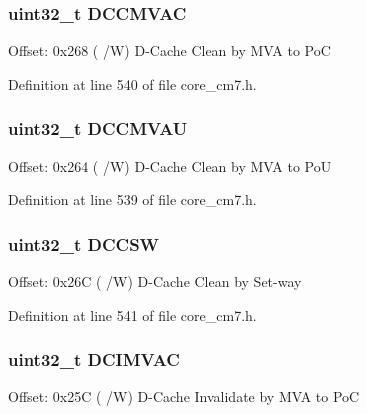 \subsubsection[{\texorpdfstring{D\+C\+C\+M\+V\+AC}{DCCMVAC}}]{ uint32\+\_\+t D\+C\+C\+M\+V\+AC}\hypertarget{struct_s_c_b___type_acc23dc74d8f0378d81bc72302e325e50}{}\label{struct_s_c_b___type_acc23dc74d8f0378d81bc72302e325e50}
Offset\+: 0x268 ( /W) D-\/\+Cache Clean by M\+VA to PoC 

Definition at line 540 of file core\+\_\+cm7.\+h.

\subsubsection[{\texorpdfstring{D\+C\+C\+M\+V\+AU}{DCCMVAU}}]{ uint32\+\_\+t D\+C\+C\+M\+V\+AU}\hypertarget{struct_s_c_b___type_a9d4029e220311690756d836948e71393}{}\label{struct_s_c_b___type_a9d4029e220311690756d836948e71393}
Offset\+: 0x264 ( /W) D-\/\+Cache Clean by M\+VA to PoU 

Definition at line 539 of file core\+\_\+cm7.\+h.

\subsubsection[{\texorpdfstring{D\+C\+C\+SW}{DCCSW}}]{ uint32\+\_\+t D\+C\+C\+SW}\hypertarget{struct_s_c_b___type_a2bf149d6d8f4fa59e25aee340512cb79}{}\label{struct_s_c_b___type_a2bf149d6d8f4fa59e25aee340512cb79}
Offset\+: 0x26C ( /W) D-\/\+Cache Clean by Set-\/way 

Definition at line 541 of file core\+\_\+cm7.\+h.

\subsubsection[{\texorpdfstring{D\+C\+I\+M\+V\+AC}{DCIMVAC}}]{ uint32\+\_\+t D\+C\+I\+M\+V\+AC}\hypertarget{struct_s_c_b___type_a72402d657f9e448afce57bbd8577864d}{}\label{struct_s_c_b___type_a72402d657f9e448afce57bbd8577864d}
Offset\+: 0x25C ( /W) D-\/\+Cache Invalidate by M\+VA to PoC 

